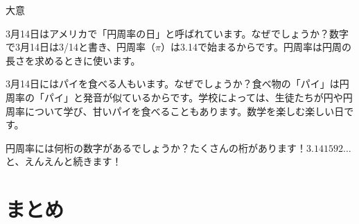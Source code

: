\documentclass[aspectratio=169,xcolor={dvipsnames,table}]{beamer}
\begin{document}
\begin{frame}[plain]{大意}

3月14日はアメリカで「円周率の日」と呼ばれています。なぜでしょうか？数字で3月14日は3/14と書き、円周率（$\pi$）は3.14で始まるからです。円周率は円周の長さを求めるときに使います。

3月14日にはパイを食べる人もいます。なぜでしょうか？食べ物の「パイ」は円周率の「パイ」と発音が似ているからです。学校によっては、生徒たちが円や円周率について学び、甘いパイを食べることもあります。数学を楽しむ楽しい日です。

円周率には何桁の数字があるでしょうか？たくさんの桁があります！$3.141592 \ldots$と、えんえんと続きます！
\end{frame}
\section{まとめ}
\end{document}
